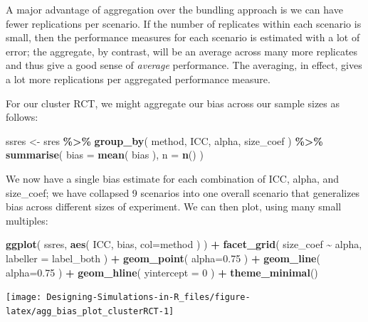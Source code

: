 \documentclass[
]{book}
\newenvironment{Shaded}{\begin{snugshade}}{\end{snugshade}}
\newcommand{\AttributeTok}[1]{\textcolor[rgb]{0.13,0.29,0.53}{#1}}
\newcommand{\DecValTok}[1]{\textcolor[rgb]{0.00,0.00,0.81}{#1}}
\newcommand{\FloatTok}[1]{\textcolor[rgb]{0.00,0.00,0.81}{#1}}
\newcommand{\FunctionTok}[1]{\textcolor[rgb]{0.13,0.29,0.53}{\textbf{#1}}}
\newcommand{\NormalTok}[1]{#1}
\newcommand{\OtherTok}[1]{\textcolor[rgb]{0.56,0.35,0.01}{#1}}
\newcommand{\SpecialCharTok}[1]{\textcolor[rgb]{0.81,0.36,0.00}{\textbf{#1}}}
\begin{document}
A major advantage of aggregation over the bundling approach is we can have fewer replications per scenario.
If the number of replicates within each scenario is small, then the performance measures for each scenario is estimated with a lot of error; the aggregate, by contrast, will be an average across many more replicates and thus give a good sense of \emph{average} performance.
The averaging, in effect, gives a lot more replications per aggregated performance measure.

For our cluster RCT, we might aggregate our bias across our sample sizes as follows:

\begin{Shaded}
\begin{Highlighting}[]
\NormalTok{ssres }\OtherTok{\textless{}{-}} 
\NormalTok{  sres }\SpecialCharTok{\%\textgreater{}\%} 
  \FunctionTok{group\_by}\NormalTok{( method, ICC, alpha, size\_coef ) }\SpecialCharTok{\%\textgreater{}\%}
  \FunctionTok{summarise}\NormalTok{( }\AttributeTok{bias =} \FunctionTok{mean}\NormalTok{( bias ),}
             \AttributeTok{n =} \FunctionTok{n}\NormalTok{() )}
\end{Highlighting}
\end{Shaded}

We now have a single bias estimate for each combination of ICC, alpha, and size\_coef; we have collapsed 9 scenarios into one overall scenario that generalizes bias across different sizes of experiment.
We can then plot, using many small multiples:

\begin{Shaded}
\begin{Highlighting}[]
\FunctionTok{ggplot}\NormalTok{( ssres, }\FunctionTok{aes}\NormalTok{( ICC, bias, }\AttributeTok{col=}\NormalTok{method ) ) }\SpecialCharTok{+}
  \FunctionTok{facet\_grid}\NormalTok{( size\_coef }\SpecialCharTok{\textasciitilde{}}\NormalTok{  alpha, }\AttributeTok{labeller =}\NormalTok{ label\_both ) }\SpecialCharTok{+}
  \FunctionTok{geom\_point}\NormalTok{( }\AttributeTok{alpha=}\FloatTok{0.75}\NormalTok{ ) }\SpecialCharTok{+} 
  \FunctionTok{geom\_line}\NormalTok{( }\AttributeTok{alpha=}\FloatTok{0.75}\NormalTok{ ) }\SpecialCharTok{+}
  \FunctionTok{geom\_hline}\NormalTok{( }\AttributeTok{yintercept =} \DecValTok{0}\NormalTok{ ) }\SpecialCharTok{+}
  \FunctionTok{theme\_minimal}\NormalTok{()}
\end{Highlighting}
\end{Shaded}

\begin{center}\texttt{[image: Designing-Simulations-in-R\_files/figure-latex/agg\_bias\_plot\_clusterRCT-1]} \end{center}
\end{document}
